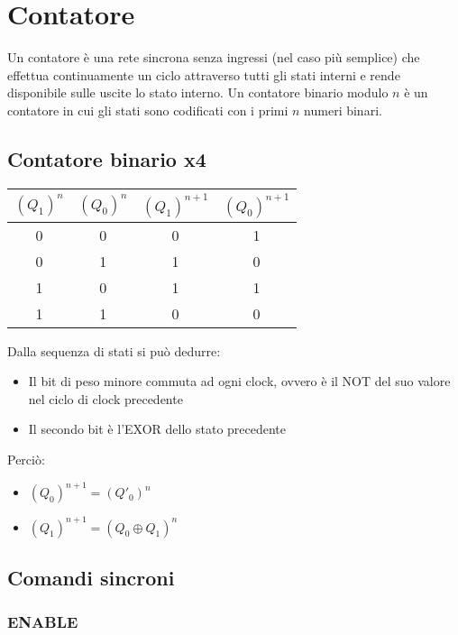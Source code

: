 \documentclass{article}
\begin{document}
\section{Contatore}

Un contatore è una rete sincrona senza ingressi (nel caso più semplice) che effettua continuamente un ciclo attraverso tutti gli stati interni e rende disponibile sulle uscite lo stato interno.
Un contatore binario modulo $n$ è un contatore in cui gli stati sono codificati con i primi $n$ numeri binari.

\subsection{Contatore binario x4}

\begin{center}
\begin{tabular}{ |c|c|c|c| }
\hline
$(Q_1)^n$ & $(Q_0)^n$ & $(Q_1)^{n+1}$ & $(Q_0)^{n+1}$ \\
\hline
\hline
0 & 0 & 0 & 1 \\
0 & 1 & 1 & 0 \\
1 & 0 & 1 & 1 \\
1 & 1 & 0 & 0 \\
\hline
\end{tabular}
\end{center}

\noindent
Dalla sequenza di stati si può dedurre:

\begin{itemize}
    \item Il bit di peso minore commuta ad ogni clock, ovvero è il NOT del suo valore nel ciclo di clock precedente
    \item Il secondo bit è l'EXOR dello stato precedente
\end{itemize}

\noindent
Perciò:

\begin{itemize}
    \item $(Q_0)^{n+1} = (Q'_0)^n$
    \item $(Q_1)^{n+1} = (Q_0 \oplus Q_1)^n$
\end{itemize}

\subsection{Comandi sincroni}

\subsubsection{ENABLE}
\end{document}
